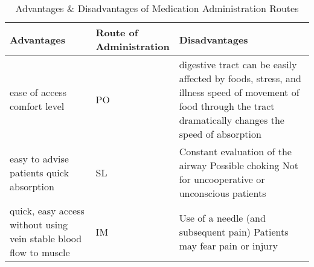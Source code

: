 \documentclass[../../EMT-169.tex]{subfiles}
\begin{document}
\begin{table}[ht]
	\centering
	\caption{Advantages \& Disadvantages of Medication Administration Routes}
	
	\bgroup
	\def\arraystretch{2}%
	\begin{tabular}{p{4.5cm}|P{3cm}|p{5.5cm}}
		\hline
		\textbf{Advantages}									& 	\textbf{Route of \newline Administration}	&	\textbf{Disadvantages} \\ \hline \hline
		ease of access \newline
		comfort level 										&   PO											& 	digestive tract can be easily affected by foods, stress, and illness \newline
		speed of movement of food through the tract dramatically changes the speed of absorption \\
		
		easy to advise patients \newline
		quick absorption  									&   SL											& 	Constant evaluation of the airway \newline
		Possible choking \newline
		Not for uncooperative or unconscious patients \\
		
		quick, easy access without using vein \newline
		stable blood flow to muscle  						&   IM											&	Use of a needle (and subsequent pain) \newline
		Patients may fear pain or injury \\ \hline
	\end{tabular}
	\egroup
\end{table}
	
\end{document}
